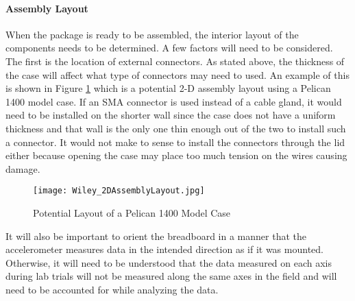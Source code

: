 \paragraph{Assembly Layout}
When the package is ready to be assembled, the interior layout of the components needs to be determined. A few factors will need to be considered. 
The first is the location of external connectors. As stated above, the thickness of the case will affect what type of connectors may need to used. 
An example of this is shown in Figure \ref{fig:Assembly} which is a potential 2-D assembly layout using a Pelican 1400 model case. If an SMA
connector is used instead of a cable gland, it would need to be installed on the shorter wall since the case does not have a uniform thickness and
that wall is the only one thin enough out of the two to install such a connector. It would not make to sense to install the connectors through
the lid either because opening the case may place too much tension on the wires causing damage. 

\begin{figure}[h]
\centering
\texttt{[image: Wiley\_2DAssemblyLayout.jpg]}
\caption{\label{fig:Assembly} Potential Layout of a Pelican 1400 Model Case}
\end{figure}

It will also be important to orient the breadboard in a manner that the accelerometer measures data in the intended direction as if it was mounted. 
Otherwise, it will need to be understood that the data measured on each axis during lab trials will not be measured along the same axes in the field and
will need to be accounted for while analyzing the data. 


